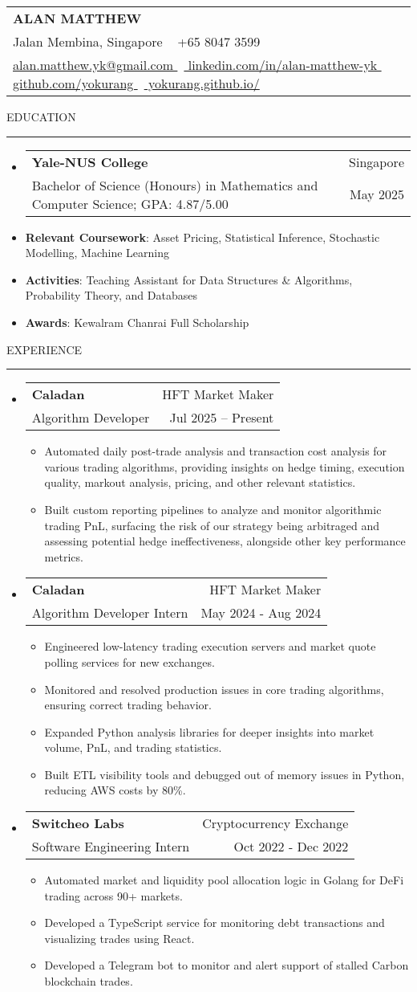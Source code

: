 \documentclass[letterpaper, 11pt]{article}
\makeatletter
\def\sectionlineskip{\medskip}
\def\sectionskip{\medskip}
\def\namesize{\LARGE}
\newcommand{\ResumeHeader}[6]{
  \noindent
  \begin{tabularx}{\textwidth}{>{\centering\arraybackslash}X}
    \namesize\MakeUppercase{\textbf{\fullname}} \\
    #1 \textbar\ #2 \\
    #3 \textbar\ #4 \textbar\ #5 \textbar\ #6 \\
  \end{tabularx}
}
\def \fullname { Alan Matthew }
\def \linkedinlink { https://www.linkedin.com/in/alan-matthew-yk }
\def \linkedintext { linkedin.com/in/alan-matthew-yk }
\def \phonenumber { +65 8047 3599 }
\def \githublink { https://github.com/yokurang }
\def \githubtext { github.com/yokurang }
\def \emaillink { mailto:alan.matthew.yk@gmail.com }
\def \emailtext { alan.matthew.yk@gmail.com }
\def \websitelink { https://yokurang.github.io/ }
\def \websitetext { yokurang.github.io/ }
\def \address { 9 Jalan Membina, Singapore }
\def \headertype {\ResumeHeader}
\def \linkedin {\href{\linkedinlink}{\linkedintext}}
\def \phone {{\phonenumber}}
\def \email {\href{\emaillink}{\emailtext}}
\def \github {\href{\githublink}{\githubtext}}
\def \website {\href{\websitelink}{\websitetext}}
\newcommand{\SectionHeading}[1]{
  \sectionskip
  \raggedright\raggedbottom\MakeUppercase{\large{#1}}
  \sectionlineskip
  \hrule
  \color{black}
}
\newcommand{\ResumeEntryTSDL}[4]{
  \vspace{1pt}\item
    \begin{tabular*}{\textwidth}[t]{l@{\extracolsep{\fill}}r} 
      \textbf{#1} & #2 \\
      #3 & #4 \\
    \end{tabular*}\vspace{-2.835pt} %
}
\newcommand{\ResumeItem}[2]{
  \item{
    \textbf{#1}{: #2 \vspace{-2.835pt}}
  }
}
\newcommand{\ResumeItemDefault}[1]{
  \item{
    #1 \vspace{-2.835pt}
  }
}
\newcommand{\ResumeSubItem}[2]{\ResumeItem{#1}{#2}\vspace{-2.835pt}}
\newcommand{\ResumeEntryStart}{\begin{itemize}[leftmargin=0mm, label={}]}
\newcommand{\ResumeEntryEnd}{\end{itemize}\vspace{-2.835pt}} %
\newcommand{\ResumeItemListStart}{\begin{itemize}[leftmargin=5mm, label=$\bullet$, itemsep=1mm, parsep=1mm]} %
\newcommand{\ResumeItemListEnd}{\end{itemize}}
\makeatother
\begin{document}
  \headertype{\address}{\phone}{\email}{\linkedin}{\github}{\website}
  
  \SectionHeading{Education}
  \ResumeEntryStart
    \ResumeEntryTSDL{Yale-NUS College} {Singapore}
    {Bachelor of Science (Honours) in Mathematics and Computer Science; GPA: 4.87/5.00} {May 2025}
    \ResumeSubItem{Relevant Coursework}{Asset Pricing, Statistical Inference, Stochastic Modelling, Machine Learning}
    \ResumeSubItem{Activities}{Teaching Assistant for Data Structures \& Algorithms, Probability Theory, and Databases}
    \ResumeSubItem{Awards}{Kewalram Chanrai Full Scholarship}
  \ResumeEntryEnd

  \vspace{5pt}

  \SectionHeading{Experience}

  \ResumeEntryStart
  \ResumeEntryTSDL{Caladan}{HFT Market Maker}{Algorithm Developer}{Jul 2025 – Present}
  \ResumeItemListStart
  \ResumeItemDefault{Automated daily post-trade analysis and transaction cost analysis for various trading algorithms, providing insights on hedge timing, execution quality, markout analysis, pricing, and other relevant statistics.}
  \ResumeItemDefault{Built custom reporting pipelines to analyze and monitor algorithmic trading PnL, surfacing the risk of our strategy being arbitraged and assessing potential hedge ineffectiveness, alongside other key performance metrics.}
  \ResumeItemListEnd
  \ResumeEntryEnd

  \ResumeEntryStart
  \ResumeEntryTSDL{Caladan}{HFT Market Maker}{Algorithm Developer Intern}{May 2024 - Aug 2024}
  \ResumeItemListStart
  \ResumeItemDefault{Engineered low-latency trading execution servers and market quote polling services for new exchanges.}
  \ResumeItemDefault{Monitored and resolved production issues in core trading algorithms, ensuring correct trading behavior.}
  \ResumeItemDefault{Expanded Python analysis libraries for deeper insights into market volume, PnL, and trading statistics.}
  \ResumeItemDefault{Built ETL visibility tools and debugged out of memory issues in Python, reducing AWS costs by 80\%.}
  \ResumeItemListEnd
  \ResumeEntryEnd

  \ResumeEntryStart
    \ResumeEntryTSDL{Switcheo Labs}{Cryptocurrency Exchange}{Software Engineering Intern}{Oct 2022 - Dec 2022}
    \ResumeItemListStart
    \ResumeItemDefault{Automated market and liquidity pool allocation logic in Golang for DeFi trading across 90+ markets.}
    \ResumeItemDefault{Developed a TypeScript service for monitoring debt transactions and visualizing trades using React.}
    \ResumeItemDefault{Developed a Telegram bot to monitor and alert support of stalled Carbon blockchain trades.}
    \ResumeItemListEnd
  \ResumeEntryEnd
\end{document}
